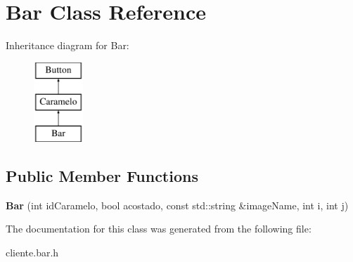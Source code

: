 \hypertarget{classBar}{\section{Bar Class Reference}
\label{classBar}
}
Inheritance diagram for Bar\-:\begin{figure}[H]
\begin{center}
\leavevmode
\includegraphics[height=3.000000cm]{classBar}
\end{center}
\end{figure}
\subsection*{Public Member Functions}
\begin{DoxyCompactItemize}
\item 
\hypertarget{classBar_adc31ab40c14d0dbe9f7f41f3bc629598}{{\bfseries Bar} (int id\-Caramelo, bool acostado, const std\-::string \&image\-Name, int i, int j)}\label{classBar_adc31ab40c14d0dbe9f7f41f3bc629598}

\end{DoxyCompactItemize}


The documentation for this class was generated from the following file\-:\begin{DoxyCompactItemize}
\item 
cliente.\-bar.\-h\end{DoxyCompactItemize}

